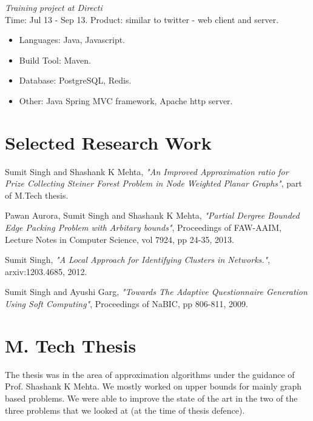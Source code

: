 \documentclass[margin,line]{resume}
\begin{document}
\begin{resume}
\textit{Training project at Directi}\\
Time: Jul 13 - Sep 13.
Product: similar to twitter - web client and server.\\
 \begin{itemize}
\item Languages: Java, Javascript.
\item Build Tool: Maven.
\item Database: PostgreSQL, Redis.
\item Other: Java Spring MVC framework, Apache http server.  
 \end{itemize}



    \section{\mysidestyle Selected Research Work}
\vspace{-2mm}
Sumit Singh and Shashank K Mehta, \textit{ "An Improved Approximation ratio for Prize Collecting Steiner Forest Problem in Node Weighted Planar Graphs"}, part of M.Tech thesis.

\vspace{-2mm}
Pawan Aurora, Sumit Singh and Shashank K Mehta, \textit{"Partial Dergree Bounded Edge Packing Problem with Arbitary bounds"}, Proceedings of FAW-AAIM, Lecture Notes in Computer Science, vol 7924, pp 24-35, 2013. 

\vspace{-2mm}
Sumit Singh, \textit{"A Local Approach for Identifying Clusters in Networks."}, arxiv:1203.4685, 2012.

\vspace{-2mm}
Sumit Singh and Ayushi Garg, \textit{"Towards The Adaptive Questionnaire Generation Using Soft Computing"}, Proceedings of NaBIC, pp 806-811, 2009.



    \section{\mysidestyle M. Tech Thesis}
The thesis was in the area of approximation algorithms under the guidance of Prof. Shashank K Mehta. 
We mostly worked on upper bounds for mainly graph based problems. We were able to improve the state of the art in  the two of the three problems that we looked at (at the time of thesis defence).
   

\end{resume}
\end{document}
